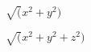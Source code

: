 \documentclass{article}
\begin{document}
$\sqrt(x^2 + y^2)$
\pagebreak

$\sqrt(x^2 + y^2 + z^2)$
\pagebreak
\end{document}

